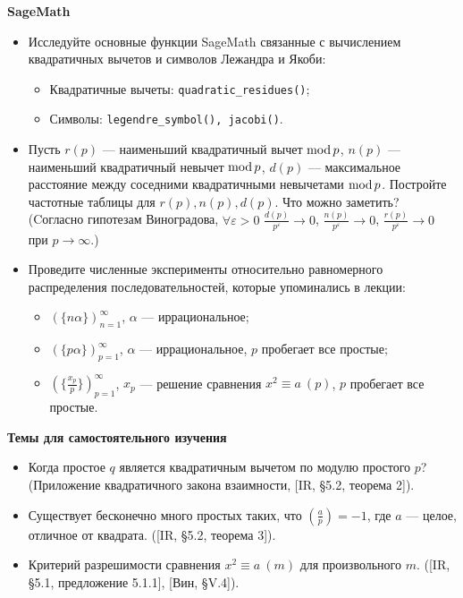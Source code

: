\noindent\textbf{SageMath}
\begin{itemize}[topsep=0pt]
    \item Исследуйте основные функции SageMath связанные с вычислением квадратичных вычетов и символов Лежандра и Якоби:
    \begin{itemize}[noitemsep,topsep=0pt]
        \item Квадратичные вычеты: \texttt{quadratic\_residues()};
        \item Символы: \texttt{legendre\_symbol(), jacobi()}.
    \end{itemize}


    \item Пусть $r(p)$ --- наименьший квадратичный вычет $\operatorname{mod} p$, $n(p)$ --- наименьший квадратичный невычет $\operatorname{mod} p$, $d(p)$ --- максимальное расстояние между соседними квадратичными невычетами $\operatorname{mod} p$. Постройте частотные таблицы для $r(p), n(p), d(p)$. Что можно заметить?\\
    (Cогласно гипотезам Виноградова, $\forall \varepsilon > 0$ $\frac{d(p)}{p^\varepsilon} \rightarrow 0$, $\frac{n(p)}{p^\varepsilon} \rightarrow 0$, $\frac{r(p)}{p^\varepsilon} \rightarrow 0$ при $p \rightarrow \infty$.)
    
    \item  Проведите численные эксперименты относительно равномерного распределения последовательностей, которые упоминались в лекции: \begin{itemize}[noitemsep,topsep=0pt]
        \item $(\{n\alpha\})_{n=1}^\infty$, $\alpha$ --- иррациональное;
        \item $(\{p\alpha\})_{p=1}^\infty$, $\alpha$ --- иррациональное, $p$ пробегает все простые;
        \item $(\{\frac{x_p}{p}\})_{p=1}^\infty$, $x_p$ --- решение сравнения $x^2 \equiv a\ (p)$, $p$ пробегает все простые.
     \end{itemize}
\end{itemize}

\noindent\textbf{Темы для самостоятельного изучения}
\begin{itemize}[topsep=0pt]
    \item Когда простое $q$ является квадратичным вычетом по модулю простого $p$? (Приложение квадратичного закона взаимности, [IR, \S 5.2, теорема 2]).
    \item Существует бесконечно много простых таких, что $\left(\frac{a}{p}\right)=-1$, где $a$ --- целое, отличное от квадрата. ([IR, \S 5.2, теорема 3]).
    \item Критерий разрешимости сравнения $x^2\equiv a\ (m)$ для произвольного $m$. ([IR, \S 5.1, предложение 5.1.1], [Вин, \S V.4]).
\end{itemize}
